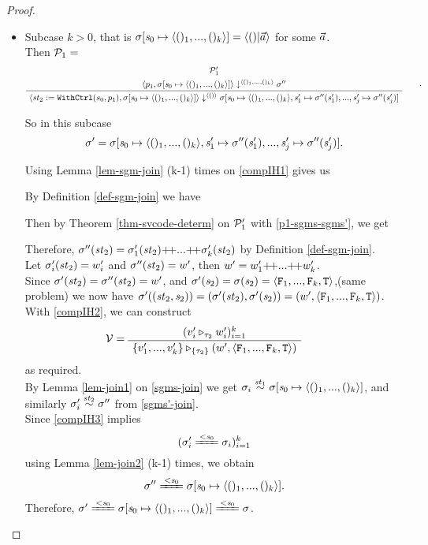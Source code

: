 \begin{proof}
\begin{itemize}
\begin{enumerate}[(i)]
\begin{itemize}
\def\sgmp-nonempty{\sgm[\s_0 \|-> \kunit, \s_1' \|-> \sgm''(\s'_1),...,
	\s'_j \|-> \sgm''(\s'_j)]}  

	\item \label{subcase-2} 
	Subcase $k > 0$, that is $\sgmsz = \< ()|\a \'>$ for some $\vec a$. \\
	Then $\mathcal{P}_1 = $
	$$\PT{
		\UCN{\MP_1'}{\seval{p_1}{\sgmsz}{\kunit}{\sgm''}}
		\UC{\seval{\withctrl {s_0} {p_1} {\st_2} } 
				  {\sgmsz} 
				  {\vunit} 
				  {\sgmp-nonempty}}
	}.$$
	
	So in this subcase $$\sgm' = \sgmp-nonempty.$$
	
	Using Lemma \ref{lem-sgm-join} (k-1) times on \eqref{compIH1} gives us
	
	By Definition \ref{def-sgm-join} we have
	
	Then by Theorem \ref{thm-svcode-determ} on $\mathcal{P}_1'$ with \eqref{p1-sgms-sgms'}, we get
	
	Therefore, $\sgm''(\st_2) = \sgm'_1(\st_2) {\++} ... {\++} \sgm'_k(\st_2)$ by Definition \ref{def-sgm-join}.\\
	Let $\sigma'_i(\mathit{st}_2) = w'_i$ and  $\sigma''(\mathit{st}_2) = w'$, then
	$w' = w'_1 {\++} ... {\++} w'_k$. \\
	
	Since $\sigma'(\mathit{st}_2) = \sigma''(\mathit{st}_2) = w'$, and {\color{red} $\sgm'(\s_2) = \sgm(\s_2) = \stwo$,(same problem)}
	we now have $\sgm'((\st_2,\s_2)) = (\sgm'(\st_2),\sgm'(\s_2)) = (w',\stwo)$. 
	With \eqref{compIH2}, we can construct
	$$\MV = 
	\PT{
		\AC{(\ValRep{v'_i}{\tau_2}{w'_i})^k_{i=1}}
		\UC{\ValRep{\Seqk{v'}}{\tseq{\tau_2}}{(w',\stwo)}}
	}$$ as required. \\

	By Lemma \ref{lem-join1} on \eqref{sgms-join} we get $\sgm_i \~{\st_1} \sgmsz$, and similarly $\sigma'_i \stackrel{\mathit{st}_2}{\sim} \sigma''$ from \eqref{sgms'-join}. \\
	
	Since \eqref{compIH3} implies $$(\sgm'_i \ConEq{\s_0} \sgm_i)^k_{i=1}$$
	using Lemma \ref{lem-join2} (k-1) times, we obtain 
	$$\sgm'' \ConEq{\s_0} \sgmsz.$$
	Therefore, $\sgm' \ConEq{\s_0} \sgmsz \ConEq{\s_0} \sgm$.\\

	\end{itemize}


\end{enumerate}
\end{itemize}
\end{proof}
